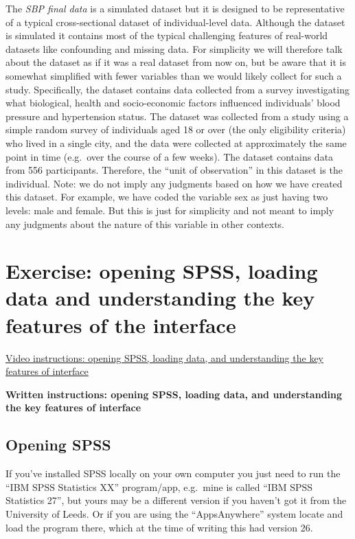 \documentclass[
]{book}
\begin{document}
The \emph{SBP final data} is a simulated dataset but it is designed to be representative of a typical cross-sectional dataset of individual-level data. Although the dataset is simulated it contains most of the typical challenging features of real-world datasets like confounding and missing data. For simplicity we will therefore talk about the dataset as if it was a real dataset from now on, but be aware that it is somewhat simplified with fewer variables than we would likely collect for such a study. Specifically, the dataset contains data collected from a survey investigating what biological, health and socio-economic factors influenced individuals' blood pressure and hypertension status. The dataset was collected from a study using a simple random survey of individuals aged 18 or over (the only eligibility criteria) who lived in a single city, and the data were collected at approximately the same point in time (e.g.~over the course of a few weeks). The dataset contains data from 556 participants. Therefore, the ``unit of observation'' in this dataset is the individual. Note: we do not imply any judgments based on how we have created this dataset. For example, we have coded the variable sex as just having two levels: male and female. But this is just for simplicity and not meant to imply any judgments about the nature of this variable in other contexts.

\hypertarget{exercise-opening-spss-loading-data-and-understanding-the-key-features-of-the-interface}{%
\section{Exercise: opening SPSS, loading data and understanding the key features of the interface}\label{exercise-opening-spss-loading-data-and-understanding-the-key-features-of-the-interface}}

\href{https://youtu.be/v39LXFUzjUg}{Video instructions: opening SPSS, loading data, and understanding the key features of interface}

\textbf{Written instructions: opening SPSS, loading data, and understanding the key features of interface}

\hypertarget{opening-spss}{%
\subsection{Opening SPSS}\label{opening-spss}}

If you've installed SPSS locally on your own computer you just need to run the ``IBM SPSS Statistics XX'' program/app, e.g.~mine is called ``IBM SPSS Statistics 27'', but yours may be a different version if you haven't got it from the University of Leeds. Or if you are using the ``AppsAnywhere'' system locate and load the program there, which at the time of writing this had version 26.
\end{document}
